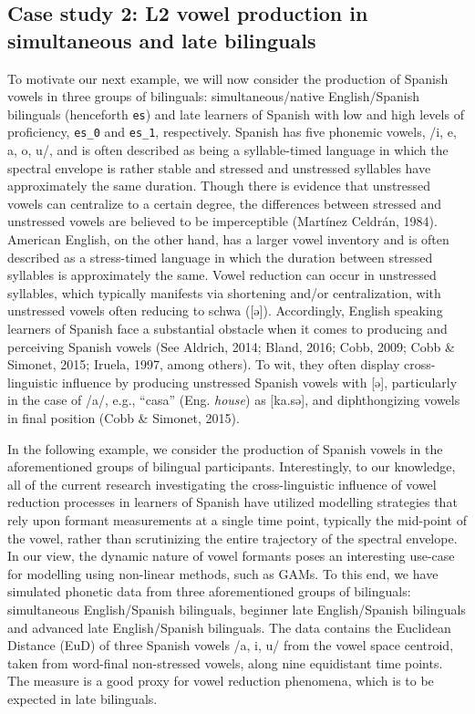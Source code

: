 \documentclass[
  letterpaper,
  DIV=11,
  numbers=noendperiod]{scrartcl}
\begin{document}
\subsection{Case study 2: L2 vowel production in simultaneous and late
bilinguals}\label{case-study-2-l2-vowel-production-in-simultaneous-and-late-bilinguals}

To motivate our next example, we will now consider the production of
Spanish vowels in three groups of bilinguals: simultaneous/native
English/Spanish bilinguals (henceforth \texttt{es}) and late learners of
Spanish with low and high levels of proficiency, \texttt{es\_0} and
\texttt{es\_1}, respectively. Spanish has five phonemic vowels, /i, e,
a, o, u/, and is often described as being a syllable-timed language in
which the spectral envelope is rather stable and stressed and unstressed
syllables have approximately the same duration. Though there is evidence
that unstressed vowels can centralize to a certain degree, the
differences between stressed and unstressed vowels are believed to be
imperceptible (Martínez Celdrán, 1984). American English, on the other
hand, has a larger vowel inventory and is often described as a
stress-timed language in which the duration between stressed syllables
is approximately the same. Vowel reduction can occur in unstressed
syllables, which typically manifests via shortening and/or
centralization, with unstressed vowels often reducing to schwa
({[}ə{]}). Accordingly, English speaking learners of Spanish face a
substantial obstacle when it comes to producing and perceiving Spanish
vowels (See Aldrich, 2014; Bland, 2016; Cobb, 2009; Cobb \& Simonet,
2015; Iruela, 1997, among others). To wit, they often display
cross-linguistic influence by producing unstressed Spanish vowels with
{[}ə{]}, particularly in the case of /a/, e.g., ``casa'' (Eng.
\emph{house}) as {[}ka.sə{]}, and diphthongizing vowels in final
position (Cobb \& Simonet, 2015).

In the following example, we consider the production of Spanish vowels
in the aforementioned groups of bilingual participants. Interestingly,
to our knowledge, all of the current research investigating the
cross-linguistic influence of vowel reduction processes in learners of
Spanish have utilized modelling strategies that rely upon formant
measurements at a single time point, typically the mid-point of the
vowel, rather than scrutinizing the entire trajectory of the spectral
envelope. In our view, the dynamic nature of vowel formants poses an
interesting use-case for modelling using non-linear methods, such as
GAMs. To this end, we have simulated phonetic data from three
aforementioned groups of bilinguals: simultaneous English/Spanish
bilinguals, beginner late English/Spanish bilinguals and advanced late
English/Spanish bilinguals. The data contains the Euclidean Distance
(EuD) of three Spanish vowels /a, i, u/ from the vowel space centroid,
taken from word-final non-stressed vowels, along nine equidistant time
points. The measure is a good proxy for vowel reduction phenomena, which
is to be expected in late bilinguals.
\end{document}
